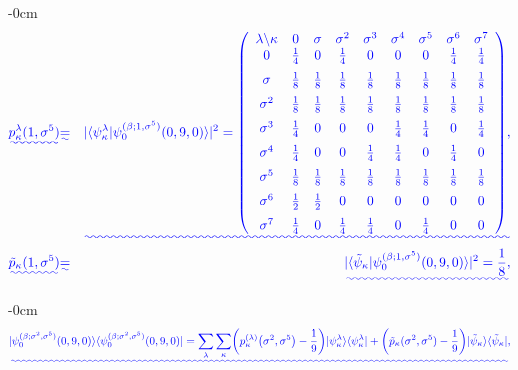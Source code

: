 \documentclass[quantumrep,article,submit,pdftex,moreauthors]{Definitions/mdpi}
\providecommand{\DIFadd}[1]{{\protect\color{blue}\uwave{#1}}} %
\begin{document}
\begin{adjustwidth}{-\extralength}{0cm}
\begin{eqnarray}
  \DIFadd{p_{\kappa}^{\lambda}(1,\sigma^{5})
  }&\DIFadd{=}& \DIFadd{|\langle \psi_{\kappa }^{\lambda}
  |\psi_{0}^{(\beta ;1,\sigma ^{5})}(0,9,0)\rangle|^{2}
  = \left(\begin{array}{ccccccccc} \lambda \backslash \kappa  & 0 & \sigma  &
      \sigma ^{2} & \sigma ^{3} & \sigma^{4} & \sigma ^{5} & \sigma ^{6} &
      \sigma ^{7} \\ 
    0 & \frac{1}{4} & 0 & \frac{1}{4} & 0 & 0 & 0 & \frac{1}{4} & \frac{1}{4} \\
    [6pt]
    \sigma & \frac{1}{8} & \frac{1}{8} & \frac{1}{8} & \frac{1}{8} & \frac{1}{8}
           & \frac{1}{8} & \frac{1}{8} & \frac{1}{8} \\ [6pt]
    \sigma^{2} & \frac{1}{8} & \frac{1}{8} & \frac{1}{8} & \frac{1}{8} &
    \frac{1}{8} & \frac{1}{8} & \frac{1}{8} & \frac{1}{8} \\  [6pt]
    \sigma^{3} & \frac{1}{4} & 0 & 0 & 0 & \frac{1}{4} & \frac{1}{4} & 0 &
    \frac{1}{4} \\  [6pt] \sigma^{4} & \frac{1}{4} & 0 & 0 & \frac{1}{4} &
    \frac{1}{4} & 0 & \frac{1}{4} & 0 \\  [6pt]
    \sigma^{5} & \frac{1}{8} & \frac{1}{8} & \frac{1}{8} & \frac{1}{8} &
    \frac{1}{8} & \frac{1}{8} & \frac{1}{8} & \frac{1}{8} \\  [6pt] \sigma^{6} &
    \frac{1}{2} & \frac{1}{2} & 0 & 0 & 0 & 0 & 0 & 0 \\  [6pt]
    \sigma^{7} & \frac{1}{4} & 0 & \frac{1}{4} & \frac{1}{4} & 0 & \frac{1}{4} &
    0 & 0
  \end{array}\right), }\\
  \DIFadd{\tilde{p}_{\kappa }(1,\sigma^{5})
  }&\DIFadd{=}& \DIFadd{|\langle \tilde\psi_\kappa | \psi_0^{(\beta;1,\sigma^5)}(0,9,0)\rangle|^2
  = \frac{1}{8},%
}\end{eqnarray}
\end{adjustwidth}

\DIFadd{and

}

\begin{adjustwidth}{-\extralength}{0cm}
\begin{equation}
  \DIFadd{|\psi_{0}^{(\beta;\sigma^{2},\sigma^{5})}(0,9,0)\rangle
  \langle \psi_{0}^{(\beta ; \sigma^{2},\sigma^{5})}(0,9,0)|
  = \sum_{\lambda }\sum_{\kappa} \left(
    p_{\kappa }^{(\lambda )}\left( \sigma ^{2},\sigma ^{5}\right) -\frac{1}{9}
  \right)
  |\psi_{\kappa}^{\lambda}\rangle \langle \psi_{\kappa}^{\lambda }|
  + \left( \tilde{p}_{\kappa }(\sigma ^{2},\sigma ^{5})-\frac{1}{9} \right)
  |\tilde{\psi}_{\kappa }\rangle \langle \tilde{\psi}_{\kappa }|,
}\end{equation}
\end{adjustwidth}
\end{document}
